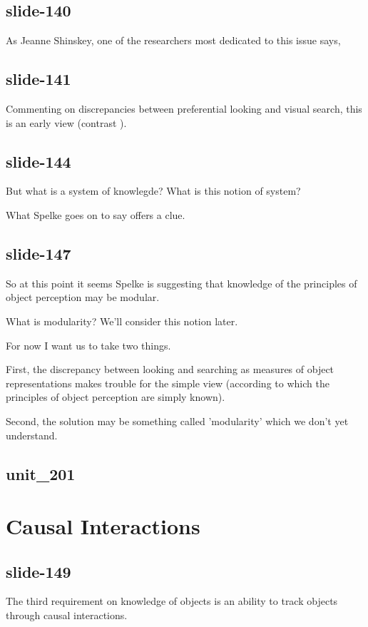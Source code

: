 \documentclass[12pt,\papersize]{extarticle}
\begin{document}
\subsection{slide-140}
As Jeanne Shinskey, one of the researchers most dedicated to this issue says,
 
\subsection{slide-141}
Commenting on discrepancies between preferential looking and visual search, this is an early view (contrast \citealp{Spelke:2001pg}).
 
\subsection{slide-144}
But what is a system of knowlegde?  What is this notion of system?
 
What Spelke goes on to say offers a clue.
 
\subsection{slide-147}
So at this point it seems Spelke is suggesting that knowledge of the principles of object perception may be modular.
 
What is modularity?  We'll consider this notion later.
 
For now I want us to take two things.
 
First, the discrepancy between looking and searching as measures of object representations makes trouble for the simple view (according to which the principles of object perception are simply known).
 
Second, the solution may be something called 'modularity' which we don't yet understand.
 
\subsection{unit\_201}
 
 
\section{Causal Interactions}
 
\subsection{slide-149}
The third requirement on knowledge of objects is an ability to track objects through causal interactions.
 
\end{document}
